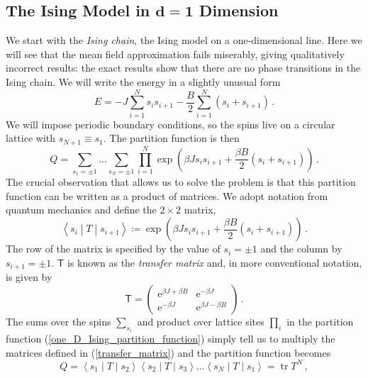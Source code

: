\documentclass{article}
\theoremstyle{plain}\theoremheaderfont{\normalfont\bfseries}\theorembodyfont{\rmfamily}\theoremseparator{.}\newtheorem*{thm}{Theorem}\newtheorem*{law}{Law}\newtheorem*{pos}{Postulate}
\numberwithin{equation}{section}
\newcommand{\ee}{\mathrm{e}}
\newcommand{\mel}[3]{\left\langle #1 \middle| #2 \middle| #3 \right\rangle}
\DeclareMathOperator{\tr}{tr}
\begin{document}
    \subsection{The Ising Model in \texorpdfstring{\(\bm{d=1}\)}{d=1} Dimension}
    We start with the \textit{Ising chain}, the Ising model on a one-dimensional line. Here we will see that the mean field approximation fails miserably, giving qualitatively incorrect results: the exact results show that there are no phase transitions in the Ising chain. We will write the energy in a slightly unusual form
    \begin{equation}
        E=-J\sum_{i=1}^{N}s_i s_{i+1}-\frac{B}{2}\sum_{i=1}^{N}(s_i + s_{i+1})\,.
    \end{equation}
    We will impose periodic boundary conditions, so the spins live on a circular lattice with \(s_{N+1}\equiv s_1\). The partition function is then
    \begin{equation}\label{one_D_Ising_partition_function}
        Q=\sum_{s_1=\pm 1}\dots\sum_{s_N=\pm 1}\prod_{i=1}^{N}\exp\left(\beta J s_i s_{i+1}+\frac{\beta B}{2}(s_i+s_{i+1})\right)\,.
    \end{equation}
    The crucial observation that allows us to solve the problem is that this partition function can be written as a product of matrices. We adopt notation from quantum mechanics and define the \(2\times 2\) matrix,
    \begin{equation}\label{transfer_matrix}
        \mel{s_i}{T}{s_{i+1}}\coloneqq\exp\left(\beta Js_i s_{i+1}+\frac{\beta B}{2}(s_i+s_{i+1})\right)\,.
    \end{equation}
    The row of the matrix is specified by the value of \(s_i=\pm 1\) and the column by \(s_{i+1}=\pm 1\). \(\mathsf{T}\) is known as the \textit{transfer matrix} and, in more conventional notation, is given by
    \begin{equation}
        \mathsf{T}=\begin{pmatrix}
            \ee^{\beta J+\beta B} & \ee^{-\beta J} \\
            \ee^{-\beta J} & \ee^{\beta J-\beta B}
        \end{pmatrix}\,.
    \end{equation}
    The sums over the spins \(\sum_{s_i}\) and product over lattice sites \(\prod_i\) in the partition function (\ref{one_D_Ising_partition_function}) simply tell us to multiply the matrices defined in (\ref{transfer_matrix}) and the partition function becomes
    \begin{equation}
        Q=\mel{s_1}{T}{s_2}\mel{s_2}{T}{s_3}\dots\mel{s_N}{T}{s_1}=\tr T^N\,,
    \end{equation}
\end{document}
